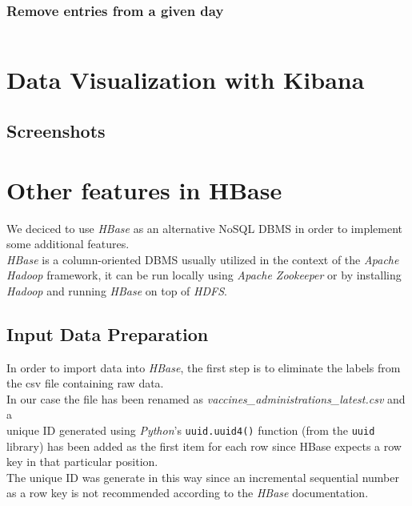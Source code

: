 \documentclass[12pt, a4paper]{article}
\begin{document}
\noindent
\blindtext

\subsubsection{Remove entries from a given day}

\begin{tcolorbox}[fontupper=\scriptsize]
    \begin{verbatim}
    \end{verbatim}
\end{tcolorbox}

\noindent
\blindtext

\clearpage

\section{Data Visualization with Kibana}

\blindtext

\subsection{Screenshots}

\blindtext

\clearpage

\section{Other features in HBase} 

We deciced to use \emph{HBase} as an alternative NoSQL DBMS in order to implement some 
additional features. \\
\emph{HBase} is a column-oriented DBMS usually utilized in the context of the 
\emph{Apache Hadoop} framework, it can be run locally using \emph{Apache Zookeeper} or 
by installing \emph{Hadoop} and running \emph{HBase} on top of \emph{HDFS}.

\subsection{Input Data Preparation}

In order to import data into \emph{HBase}, the first step is to eliminate the labels 
from the csv file containing raw data. \\
In our case the file has been renamed as \emph{vaccines\_administrations\_latest.csv} 
and a \\ unique ID generated using \emph{Python}'s \texttt{uuid.uuid4()} function 
(from the \texttt{uuid} library) has been added as the first item for each row since
HBase expects a row key in that particular position. \\ 
The unique ID was generate in this way since an incremental sequential number as a 
row key is not recommended according to the \emph{HBase} documentation. 
\end{document}
